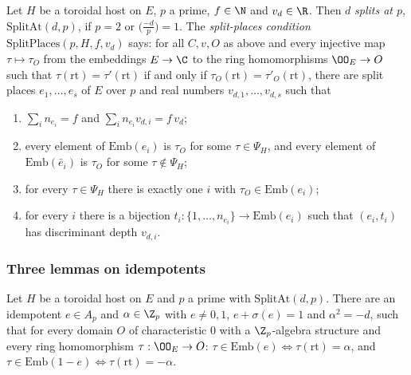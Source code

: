 \begin{definition}\label{pf:sh-local:def:splitplaces}
Let $H$ be a toroidal host on $E$, $p$ a prime, $f\in\N$ and $v_d\in\R$. Then $d$ \emph{splits at $p$},
$\mathrm{SplitAt}(d,p)$, if $p=2$ or $\bigl(\frac{-d}p\bigr)=1$. The \emph{split-places condition}
$\mathrm{SplitPlaces}(p,H,f,v_d)$ says: for all $C,v,O$ as above and every injective map $\tau\mapsto\tau_O$ from
the embeddings $E\to\C$ to the ring homomorphisms $\OO_E\to O$ such that $\tau(\mathrm{rt})=\tau'(\mathrm{rt})$ if
and only if $\tau_O(\mathrm{rt})=\tau'_O(\mathrm{rt})$, there are split places $e_1,\dots,e_s$ of $E$ over $p$ and
real numbers $v_{d,1},\dots,v_{d,s}$ such that
\begin{enumerate}[label=(\roman*)]
\item $\sum_in_{e_i}=f$ and $\sum_in_{e_i}v_{d,i}=f\,v_d$;
\item every element of $\mathrm{Emb}(e_i)$ is $\tau_O$ for some $\tau\in\Psi_H$, and every element of
$\mathrm{Emb}(\bar e_i)$ is $\tau_O$ for some $\tau\notin\Psi_H$;
\item for every $\tau\in\Psi_H$ there is exactly one $i$ with $\tau_O\in\mathrm{Emb}(e_i)$;
\item for every $i$ there is a bijection $t_i:\{1,\dots,n_{e_i}\}\to\mathrm{Emb}(e_i)$ such that $(e_i,t_i)$ has
discriminant depth $v_{d,i}$.
\end{enumerate}
\end{definition}

\subsubsection{Three lemmas on idempotents}

\begin{lemma}\label{pf:sh-local:splitidem}
Let $H$ be a toroidal host on $E$ and $p$ a prime with $\mathrm{SplitAt}(d,p)$. There are an idempotent $e\in A_p$
and $\alpha\in\Z_p$ with $e\ne0,1$, $e+\sigma(e)=1$ and $\alpha^2=-d$, such that for every domain $O$ of
characteristic $0$ with a $\Z_p$-algebra structure and every ring homomorphism $\tau:\OO_E\to O$:
$\tau\in\mathrm{Emb}(e)\iff\tau(\mathrm{rt})=\alpha$, and $\tau\in\mathrm{Emb}(1-e)\iff\tau(\mathrm{rt})=-\alpha$.
\end{lemma}

